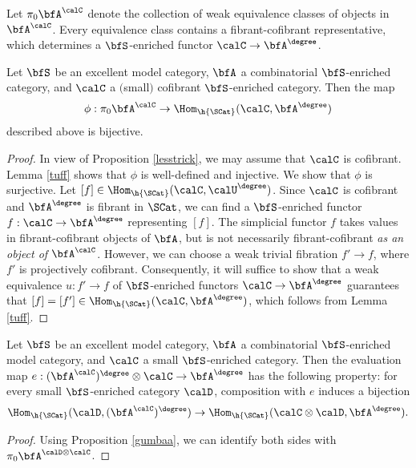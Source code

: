 Let $\pi_0 \bfA^{\calC}$ denote the collection of
weak equivalence classes of objects in $\bfA^{\calC}$. Every
equivalence class contains a fibrant-cofibrant representative, which
determines a $\bfS$-enriched functor $\calC \rightarrow \bfA^{\degree}$. 

\begin{proposition}\label{gumbaa}
Let $\bfS$ be an excellent model category, $\bfA$ a combinatorial
$\bfS$-enriched category, and $\calC$ a $($small$)$ cofibrant $\bfS$-enriched category.
Then the map
$$ \phi: \pi_0 \bfA^{\calC} \rightarrow \Hom_{\h{\SCat}}(\calC, \bfA^{\degree})$$
described above is bijective.
\end{proposition}

\begin{proof}
In view of Proposition \ref{lesstrick}, we may assume that $\calC$ is cofibrant.
Lemma \ref{tuff} shows that $\phi$ is well-defined and injective.
We show that $\phi$ is surjective. Let $[f] \in \Hom_{\h{\SCat}}(
\calC,\calU^{\degree})$. Since $\calC$ is cofibrant and $\bfA^{\degree}$
is fibrant in $\SCat$, we can find a $\bfS$-enriched functor $f: \calC
\rightarrow \bfA^{\degree}$ representing $[f]$. The simplicial
functor $f$ takes values in fibrant-cofibrant objects of $\bfA$,
but is not necessarily fibrant-cofibrant {\em as an object of}
$\bfA^{\calC}$. However, we can choose a 
weak trivial fibration $f' \rightarrow f$, where $f'$ is projectively cofibrant.
Consequently, it will suffice to show that a weak equivalence $u: f' \rightarrow f$
of $\bfS$-enriched functors $\calC \rightarrow \bfA^{\degree}$
guarantees that $[f] = [f'] \in \Hom_{\h{\SCat}}(\calC, \bfA^{\degree})$, which follows
from Lemma \ref{tuff}.
\end{proof}

\begin{proposition}\label{gumbarr}
Let $\bfS$ be an excellent model category, $\bfA$ a combinatorial $\bfS$-enriched model category,
and $\calC$ a small $\bfS$-enriched category.
Then the evaluation map
$e: ( \bfA^{\calC})^{\degree} \otimes \calC \rightarrow \bfA^{\degree}$ has
the following property: for every small $\bfS$-enriched category $\calD$, 
composition with $e$ induces a bijection
$$ \Hom_{ \h{\SCat} }( \calD, (\bfA^{\calC})^{\degree} )
\rightarrow \Hom_{ \h{\SCat} }( \calC \otimes \calD, \bfA^{\degree} ).$$
\end{proposition}

\begin{proof}
Using Proposition \ref{gumbaa}, we can identify both sides with
$\pi_0 \bfA^{ \calD \otimes \calC}$. 
\end{proof}

